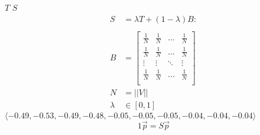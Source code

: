 \documentclass{article}
\begin{document}
$T$
$S$
\begin{align}
    S &= \lambda T +  \left( 1- \lambda \right)B :\\
\ \\
    B&= \begin{bmatrix} 
    \frac{1}{N} & \frac{1}{N} & \ldots & \frac{1}{N} \\
    \frac{1}{N} & \frac{1}{N} & \ldots & \frac{1}{N} \\
        \vdots      & \vdots      & \ddots & \vdots \\
    \frac{1}{N} & \frac{1}{N} & \ldots & \frac{1}{N} \\
    \end{bmatrix}  \\
    N&= \left| \left| V \right| \right| \\
    \lambda &\in [0,1]
\end{align}
$\langle -0.49, -0.53, -0.49, -0.48, -0.05, -0.05, -0.05, -0.04, -0.04, -0.04 \rangle$
$$
1 \vec{p} = S\vec{p}
$$
\end{document}
